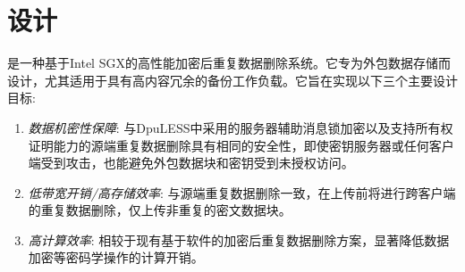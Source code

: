 \section{\sysnameS 设计}
\label{sec:sgxdedup-design}


\sysnameS 是一种基于Intel SGX的高性能加密后重复数据删除系统。它专为外包数据存储而设计，尤其适用于具有高内容冗余的备份工作负载。它旨在实现以下三个主要设计目标:
\begin{enumerate}
    \item \textit{数据机密性保障}: 与DpuLESS\cite{bellare2013DupLESS}中采用的服务器辅助消息锁加密以及支持所有权证明\cite{halevi11}能力的源端重复数据删除具有相同的安全性，即使密钥服务器或任何客户端受到攻击，\sysnameS 也能避免外包数据块和密钥受到未授权访问。
    \item \textit{低带宽开销/高存储效率}: 与源端重复数据删除一致，\sysnameS 在上传前将进行跨客户端的重复数据删除，仅上传非重复的密文数据块。
    \item \textit{高计算效率}: 相较于现有基于软件的加密后重复数据删除方案，\sysnameS 显著降低数据加密等密码学操作的计算开销。
\end{enumerate}

